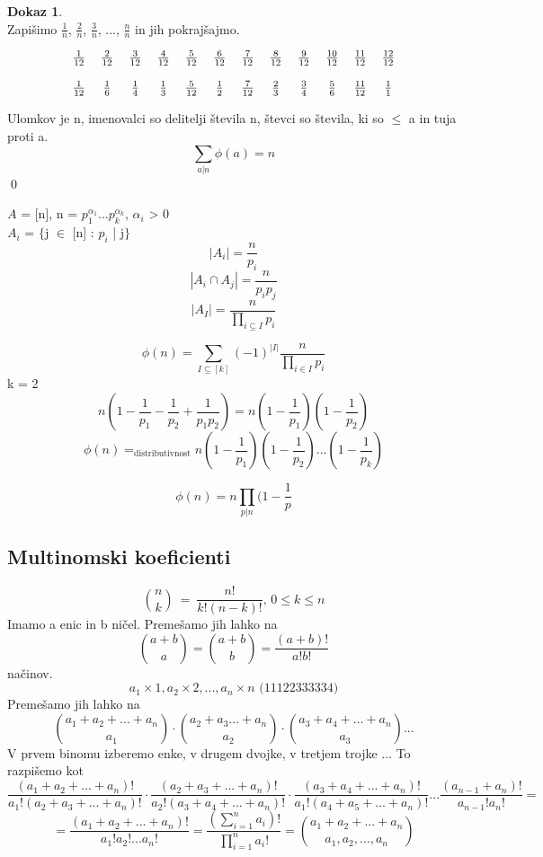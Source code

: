 \documentclass[a4paper,12pt]{article}
\theoremstyle{definition}
\newtheorem{pro}[counter]{Dokaz}
\theoremstyle{remark}
\begin{document}
\begin{pro}\mbox{}\\
Zapišimo $\frac{1}{n}$, $\frac{2}{n}$, $\frac{3}{n}$, ..., $\frac{n}{n}$ in jih pokrajšajmo.

\[
\begin{tabular}{c c c c c c c c c c c c}

$\frac{1}{12}$ & $\frac{2}{12}$ & $\frac{3}{12}$ & $\frac{4}{12}$ & $\frac{5}{12}$ & $\frac{6}{12}$ & $\frac{7}{12}$ & $\frac{8}{12}$ & $\frac{9}{12}$ & $\frac{10}{12}$ & $\frac{11}{12}$ & $\frac{12}{12}$\\
\\
$\frac{1}{12}$ & $\frac{1}{6}$ & $\frac{1}{4}$ & $\frac{1}{3}$ & $\frac{5}{12}$ & $\frac{1}{2}$ & $\frac{7}{12}$ & $\frac{2}{3}$ & $\frac{3}{4}$ & $\frac{5}{6}$ & $\frac{11}{12}$ & $\frac{1}{1}$

\end{tabular}
\]

Ulomkov je n, imenovalci so delitelji števila n, števci so števila, ki so $\leqslant$ a in tuja proti a.
\[\sum_{a | n} \phi (a) = n\]
\qed
\end{pro}
$A$ = [n], n = $p_1^{\alpha_1} ... p_k^{\alpha_k}$, $\alpha_i$ > 0\\
$A_i$ = $\{$j $\in$ [n] : $p_i$ | j$\}$
\[|A_i| = \frac{n}{p_i}\]
\[|A_i \cap A_j| = \frac{n}{p_i p_j}\]
\[|A_I| = \frac{n}{\displaystyle \prod_{i \subseteq I} p_i}\]

\[\phi (n) = \sum_{I \subseteq [k]} (-1)^{|I|} \frac{n}{\displaystyle \prod_{i \in I} p_i}\]
k = 2
\[n (1 - \frac{1}{p_1} - \frac{1}{p_2} + \frac{1}{p_1 p_2}) = n (1 - \frac{1}{p_1})(1 - \frac{1}{p_2})\]
\[\phi (n) =_{\text{distributivnost}}  n (1 - \frac{1}{p_1})(1 - \frac{1}{p_2})...(1 - \frac{1}{p_k})\]

\[\phi (n) = n \displaystyle \prod_{p | n} (1 - \frac{1}{p}\]


\subsection{Multinomski koeficienti}
\[\binom{n}{k} \ = \ \frac{n!}{k! (n - k)!}\text{, } 0 \leqslant k \leqslant n\]
Imamo a enic in b ničel. Premešamo jih lahko na 
\[\binom{a + b}{a} = \binom{a + b}{b} = \frac{(a+b)!}{a!b!}\]
načinov.\\
\[a_1 \times 1, a_2 \times  2, ..., a_n \times n \text{        (11122333334)}\]
Premešamo jih lahko na 
\[\binom{a_1 + a_2 + ... + a_n}{a_1} \cdot \binom{a_2 + a_3 ... + a_n}{a_2} \cdot \binom{a_3 + a_4 + ... + a_n}{a_3} ...\]
 V prvem binomu izberemo enke, v drugem dvojke, v tretjem trojke ... To razpišemo kot
\[\frac{(a_1 + a_2 + ... + a_n)!}{a_1!(a_2 + a_3 + ... + a_n)!} \cdot \frac{(a_2 + a_3 + ... + a_n)!}{a_2!(a_3 + a_4 + ... + a_n)!} \cdot \frac{(a_3 + a_4 + ... + a_n)!}{a_1!(a_4 + a_5 + ... + a_n)!} ... \frac{(a_{n-1}+a_n)!}{a_{n-1}!a_n!} =\]
\[= \frac{(a_1 + a_2 + ... + a_n)!}{a_1!a_2!...a_n!} = \frac{(\displaystyle \sum_{i = 1}^n a_i)!}{\displaystyle \prod_{i = 1}^n a_i!} = \binom{a_1 + a_2 + ... + a_n}{a_1, a_2, ..., a_n}\]
\end{document}
